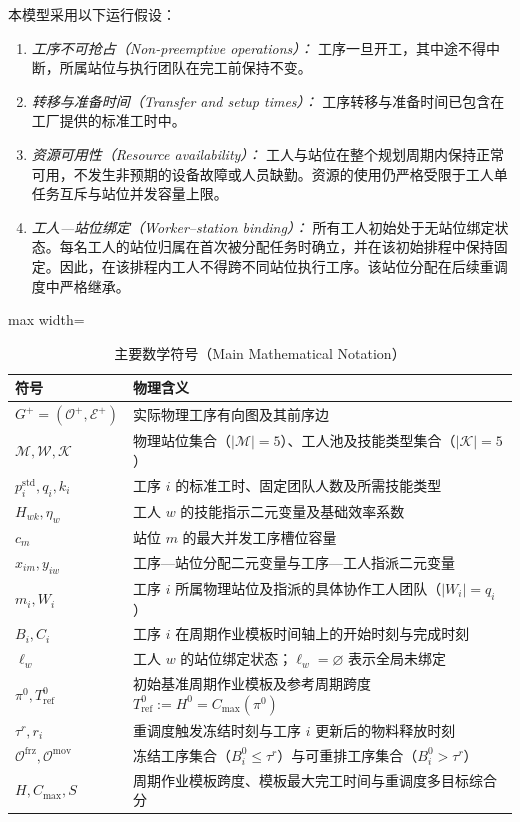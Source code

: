 \documentclass[journal,10pt]{IEEEtran}
\renewcommand{\arraystretch}{1.04}
\begin{document}
本模型采用以下运行假设：
\begin{enumerate}
\item \textit{工序不可抢占（Non-preemptive operations）：} 工序一旦开工，其中途不得中断，所属站位与执行团队在完工前保持不变。
\item \textit{转移与准备时间（Transfer and setup times）：} 工序转移与准备时间已包含在工厂提供的标准工时中。
\item \textit{资源可用性（Resource availability）：} 工人与站位在整个规划周期内保持正常可用，不发生非预期的设备故障或人员缺勤。资源的使用仍严格受限于工人单任务互斥与站位并发容量上限。
\item \textit{工人---站位绑定（Worker--station binding）：} 所有工人初始处于无站位绑定状态。每名工人的站位归属在首次被分配任务时确立，并在该初始排程中保持固定。因此，在该排程内工人不得跨不同站位执行工序。该站位分配在后续重调度中严格继承。
\end{enumerate}

\begin{table}[!t]
\centering
\caption{主要数学符号（Main Mathematical Notation）}
\label{tab:notation}
\setlength{\tabcolsep}{3pt}
\renewcommand{\arraystretch}{1.05}
\begin{adjustbox}{max width=\columnwidth}
\begin{tabular}{@{}lp{6.8cm}@{}}
\toprule
\textbf{符号} & \textbf{物理含义} \\
\midrule
$G^+=(\mathcal{O}^+,\mathcal{E}^+)$ & 实际物理工序有向图及其前序边 \\
$\mathcal{M}, \mathcal{W}, \mathcal{K}$ & 物理站位集合（$|\mathcal{M}|=5$）、工人池及技能类型集合（$|\mathcal{K}|=5$） \\
$p_i^{\mathrm{std}}, q_i, k_i$ & 工序 $i$ 的标准工时、固定团队人数及所需技能类型 \\
$H_{wk}, \eta_w$ & 工人 $w$ 的技能指示二元变量及基础效率系数 \\
$c_m$ & 站位 $m$ 的最大并发工序槽位容量 \\
$x_{im}, y_{iw}$ & 工序---站位分配二元变量与工序---工人指派二元变量 \\
$m_i, W_i$ & 工序 $i$ 所属物理站位及指派的具体协作工人团队（$|W_i|=q_i$） \\
$B_i, C_i$ & 工序 $i$ 在周期作业模板时间轴上的开始时刻与完成时刻 \\
$\ell_w$ & 工人 $w$ 的站位绑定状态；$\ell_w=\varnothing$ 表示全局未绑定 \\
$\pi^0, T_{\mathrm{ref}}^0$ & 初始基准周期作业模板及参考周期跨度 $T_{\mathrm{ref}}^0 := H^0 = C_{\max}(\pi^0)$ \\
$\tau^r, r_i$ & 重调度触发冻结时刻与工序 $i$ 更新后的物料释放时刻 \\
$\mathcal{O}^{\mathrm{frz}}, \mathcal{O}^{\mathrm{mov}}$ & 冻结工序集合（$B_i^0 \le \tau^r$）与可重排工序集合（$B_i^0 > \tau^r$） \\
$H, C_{\max}, S$ & 周期作业模板跨度、模板最大完工时间与重调度多目标综合分 \\
\bottomrule
\end{tabular}
\end{adjustbox}
\end{table}
\end{document}

